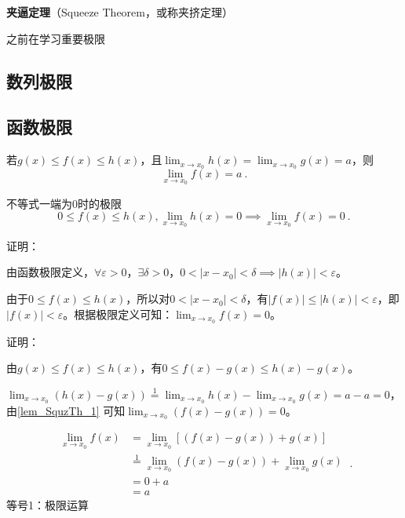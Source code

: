 
\begin{issues}
\issueDraft
\end{issues}
\textbf{夹逼定理}（Squeeze Theorem，或称夹挤定理）

之前在学习重要极限

\subsection{数列极限}

\subsection{函数极限}

若$g(x)\leq f(x)\leq h(x)$，且$\lim _{x\to x_0}h(x)=\lim _{x\to x_0}g(x)=a$，则
\begin{equation}
\lim _{x\to x_0}f(x)=a~.
\end{equation}

\begin{lemma}{不等式一端为0时的极限}\label{lem_SquzTh_1}
\begin{equation}
0\leq f(x)\leq h(x),\lim _{x\to x_0}h(x)=0\implies\lim _{x\to x_0}f(x)=0~.
\end{equation}

证明：

由函数极限定义，$\forall\varepsilon>0$，$\exists\delta>0$，$0<|x-x_0|<\delta\implies|h(x)|<\varepsilon$。

由于$0\leq f(x)\leq h(x)$，所以对$0<|x-x_0|<\delta$，有$|f(x)|\leq |h(x)|<\varepsilon$，即$|f(x)|<\varepsilon$。根据极限定义可知：$\lim _{x\to x_0}f(x)=0$。

\end{lemma}

证明：

由$g(x)\leq f(x)\leq h(x)$，有$0\leq f(x)-g(x)\leq h(x)-g(x)$。

$\lim _{x\to x_0}(h(x)-g(x))\overset{\mathrm{1}}{=}\lim _{x\to x_0}h(x)-\lim _{x\to x_0}g(x)=a-a=0$，由\autoref{lem_SquzTh_1} 可知$\lim _{x\to x_0}(f(x)-g(x))=0$。
 
$$
\begin{align*}
\lim _{x\to x_0}f(x) &= \lim _{x\to x_0}[(f(x)-g(x))+g(x)] \\ 
&\overset{\mathrm{1}}{=} \lim _{x\to x_0}(f(x)-g(x))+\lim _{x\to x_0}g(x)\\ 
&= 0+a\\ 
&=a \end{align*}~.
$$
等号1：极限运算